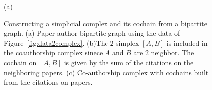 \begin{figure}[htpb]
%
\settowidth{\tempwidth}{\usebox{\tempbox}}%
\hfil\begin{minipage}[b]{\tempwidth}%
\raisebox{-\height}{\usebox{\tempbox}}%
\scriptsize{\caption*{(a)}}%
\end{minipage}%
%
\settowidth{\tempwidth}{\usebox{\tempbox}}%
\hfil\begin{minipage}[b]{\tempwidth}%
\raisebox{-\height}{\usebox{\tempbox}}%
\scriptsize{}%
\end{minipage}%
\vspace{5pt}
\settowidth{\tempwidth}{\usebox{\tempbox}}%
\hfil\begin{minipage}[b]{\tempwidth}%
\raisebox{-\height}{\usebox{\tempbox}}%
\scriptsize{}%
\end{minipage}%
\caption{Constructing a simplicial complex and its cochain from a bipartite graph. (a) Paper-author bipartite graph using the data of Figure~\ref{fig:data2complex}. (b)The $2$-simplex $[A,B]$ is included in the coauthorship complex sinece $A$ and $B$ are $2$ neighbor. The cochain on $[A,B]$ is given by the sum of the citations on the neighboring papers. (c) Co-authorship complex with cochains built from the citations on papers.}\label{fig:bipartite}
\end{figure}


